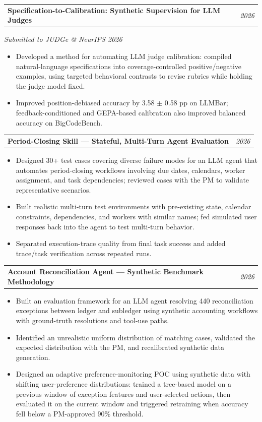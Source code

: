 \documentclass[10pt,letterpaper]{article}
\makeatletter
\newcommand{\researchHeading}[2]{%
\vspace{5pt}
\begin{tabularx}{\textwidth}{@{}Xr@{}}
\textbf{#1} & \textit{#2}
\end{tabularx}
\vspace{-10pt}}
\makeatother
\begin{document}
\researchHeading{Specification-to-Calibration: Synthetic Supervision for LLM Judges}{2026}
\textit{Submitted to JUDGe @ NeurIPS 2026}
\vspace{10pt}
\begin{itemize}
\item Developed a method for automating LLM judge calibration: compiled natural-language specifications into coverage-controlled positive/negative examples, using targeted behavioral contrasts to revise rubrics while holding the judge model fixed.
\item Improved position-debiased accuracy by 3.58 $\pm$ 0.58 pp on LLMBar; feedback-conditioned and GEPA-based calibration also improved balanced accuracy on BigCodeBench.
\end{itemize}

\researchHeading{Period-Closing Skill --- Stateful, Multi-Turn Agent Evaluation}{2026}
\begin{itemize}
\item Designed 30+ test cases covering diverse failure modes for an LLM agent that automates period-closing workflows involving due dates, calendars, worker assignment, and task dependencies; reviewed cases with the PM to validate representative scenarios.
\item Built realistic multi-turn test environments with pre-existing state, calendar constraints, dependencies, and workers with similar names; fed simulated user responses back into the agent to test multi-turn behavior.
\item Separated execution-trace quality from final task success and added trace/task verification across repeated runs.
\end{itemize}

\researchHeading {Account Reconciliation Agent --- Synthetic Benchmark Methodology} {2026}
\begin{itemize}
    \item Built an evaluation framework for an LLM agent resolving 440 reconciliation exceptions between ledger and subledger using synthetic accounting workflows with ground-truth resolutions and tool-use paths.
    \item Identified an unrealistic uniform distribution of matching cases, validated the expected distribution with the PM, and recalibrated synthetic data generation.
    \item Designed an adaptive preference-monitoring POC using synthetic data with shifting user-preference distributions: trained a tree-based model on a previous window of exception features and user-selected actions, then evaluated it on the current window and triggered retraining when accuracy fell below a PM-approved 90\% threshold.
\end{itemize}
\end{document}
